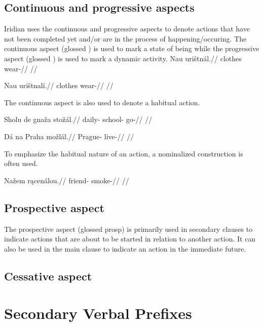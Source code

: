 \subsection{Continuous and progressive aspects}
Iridian uses the continuous and progressive aspects to denote actions that have not been completed yet and/or are in the process of happening/occuring. The continuous aspect (glossed ) is used to mark a state of being while the progressive aspect (glossed ) is used to mark a dynamic activity.
\pex
\begingl
\gla Nau uri\v{s}tn\'al.//
\glb clothes wear-//
\glft {} //
\endgl
\xe

\pex
\begingl
\gla Nau uri\v{s}tnal\'i.//
\glb clothes wear-//
\glft {} //
\endgl
\xe

The continuous aspect is also used to denote a habitual action.

\pex
\begingl
\gla Sholu de gna\v{z}a sto\v{z}\'al.//
\glb daily-  school- go-//
\glft {} //
\endgl
\xe

\pex
\begingl
\gla D\'a na Praha mo\v{z}l\'al.//
\glb {}  Prague- live-//
\glft {} //
\endgl
\xe

To emphasize the habitual nature of an action, a nominalized construction is often used.

\pex
\begingl
\gla Na\v{z}em r\k{a}cen\'alou.//
\glb friend- smoke-//
\glft {} //
\endgl
\xe

\subsection{Prospective aspect}
\par The prospective aspect (glossed {\sc prosp}) is primarily used in secondary clauses to indicate actions that are about to be started in relation to another action. It can also be used in the main clause to indicate an action in the immediate future.

\subsection{Cessative aspect}




\section{Secondary Verbal Prefixes}

